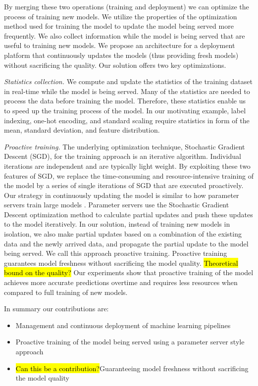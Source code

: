 By merging these two operations (training and deployment) we can optimize the process of training new models.
We utilize the properties of the optimization method used for training the model to update the model being served more frequently.
We also collect information while the model is being served that are useful to training new models.
We propose an architecture for a deployment platform that continuously updates the models (thus providing fresh models) without sacrificing the quality.
Our solution offers two key optimizations.

\textit{Statistics collection.} 
We compute and update the statistics of the training dataset in real-time while the model is being served. 
Many of the statistics are needed to process the data before training the model.
Therefore, these statistics enable us to speed up the training process of the model.
In our motivating example, label indexing, one-hot encoding, 
and standard scaling require statistics in form of the mean, standard deviation, and feature distribution.

\textit{Proactive training.}
The underlying optimization technique, Stochastic Gradient Descent (SGD), for the training approach is an iterative algorithm.
Individual iterations are independent and are typically light weight.
By exploiting these two features of SGD, we replace the time-consuming and resource-intensive training of the model by a series of single iterations of SGD that are executed proactively.
Our strategy in continuously updating the model is similar to how parameter servers train large models \cite{li2014scaling} .
Parameter servers use the Stochastic Gradient Descent optimization method to calculate partial updates and push these updates to the model iteratively.
In our solution, instead of training new models in isolation, we also make partial updates based on a combination of the existing data and the newly arrived data, and propagate the partial update to the model being served.
We call this approach proactive training.
Proactive training guarantees model freshness without sacrificing the model quality.
\hl{Theoretical bound on the quality?}
Our experiments show that proactive training of the model achieves more accurate predictions overtime and requires less resources when compared to full training of new models.

In summary our contributions are:
\begin{itemize}
\item Management and continuous deployment of machine learning pipelines
\item Proactive training of the model being served using a parameter server style approach
\item \hl{Can this be a contribution?}Guaranteeing model freshness without sacrificing the model quality
\end{itemize}

